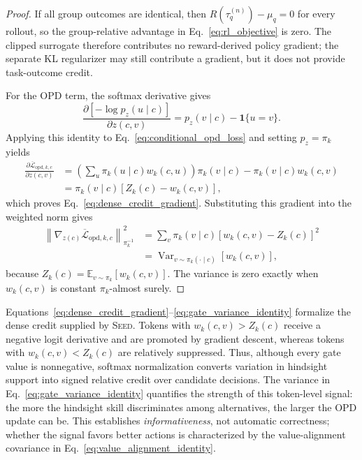 \begin{proof}
If all group outcomes are identical, then
$R(\tau_q^{(n)})-\mu_q=0$
for every rollout, so the group-relative advantage in Eq.~\ref{eq:rl_objective} is zero. The clipped surrogate therefore contributes no reward-derived policy gradient; the separate KL regularizer may still contribute a gradient, but it does not provide task-outcome credit.

For the OPD term, the softmax derivative gives
\[
 \frac{\partial[-\log p_z(u\mid c)]}{\partial z(c,v)}
 =
 p_z(v\mid c)-\mathbf 1\{u=v\}.
\]
Applying this identity to Eq.~\ref{eq:conditional_opd_loss} and setting $p_z=\pi_k$ yields
\begin{align*}
 \frac{\partial
 \overline{\mathcal L}_{\mathrm{opd},k,c}}
 {\partial z(c,v)}
 &=
 \left(
 \sum_u\pi_k(u\mid c)w_k(c,u)
 \right)\pi_k(v\mid c)
 -
 \pi_k(v\mid c)w_k(c,v)
 \\
 &=
 \pi_k(v\mid c)
 \left[Z_k(c)-w_k(c,v)\right],
\end{align*}
which proves Eq.~\ref{eq:dense_credit_gradient}. Substituting this gradient into the weighted norm gives
\begin{align*}
 \left\|
 \nabla_{z(c)}
 \overline{\mathcal L}_{\mathrm{opd},k,c}
 \right\|^2_{\pi_k^{-1}}
 &=
 \sum_v
 \pi_k(v\mid c)
 \left[w_k(c,v)-Z_k(c)\right]^2
 \\
 &=
 \operatorname{Var}_{v\sim\pi_k(\cdot\mid c)}
 \left[w_k(c,v)\right],
\end{align*}
because $Z_k(c)=\mathbb E_{v\sim\pi_k}[w_k(c,v)]$. The variance is zero exactly when $w_k(c,v)$ is constant $\pi_k$-almost surely.
\end{proof}

Equations~\ref{eq:dense_credit_gradient}--\ref{eq:gate_variance_identity} formalize the dense credit supplied by \textsc{Seed}. Tokens with
$w_k(c,v)>Z_k(c)$
receive a negative logit derivative and are promoted by gradient descent, whereas tokens with
$w_k(c,v)<Z_k(c)$
are relatively suppressed. Thus, although every gate value is nonnegative, softmax normalization converts variation in hindsight support into signed relative credit over candidate decisions. The variance in Eq.~\ref{eq:gate_variance_identity} quantifies the strength of this token-level signal: the more the hindsight skill discriminates among alternatives, the larger the OPD update can be. This establishes \emph{informativeness}, not automatic correctness; whether the signal favors better actions is characterized by the value-alignment covariance in Eq.~\ref{eq:value_alignment_identity}.

